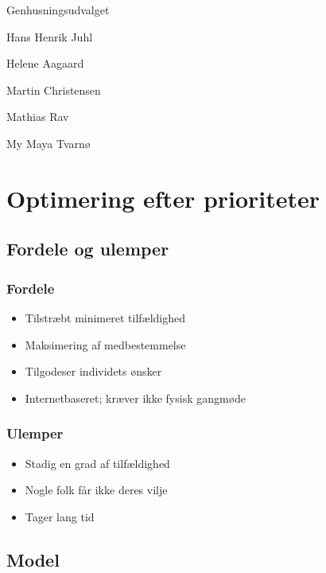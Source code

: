 \documentclass[article,oneside,11pt]{memoir}
\begin{document}
\begin{centering}
{\LARGE Genhusningsudvalget}

\vspace{1em} {\large
Hans Henrik Juhl

Helene Aagaard

Martin Christensen

Mathias Rav

My Maya Tvarnø

}
\end{centering}

\chapter{Optimering efter prioriteter}

\section{Fordele og ulemper}
\begin{minipage}[t]{0.45\linewidth}
\small
\subsection{Fordele}
\begin{itemize}[leftmargin=0ex]
\item[] Tilstræbt minimeret tilfældighed
\item[] Maksimering af medbestemmelse
\item[] Tilgodeser individets ønsker
\item[] Internetbaseret; kræver ikke fysisk gangmøde
\end{itemize}
\end{minipage}
\hspace{0.1\linewidth}
\begin{minipage}[t]{0.45\linewidth}
\small
\subsection{Ulemper}
\begin{itemize}[leftmargin=0ex]
\item[] Stadig en grad af tilfældighed
\item[] Nogle folk får ikke deres vilje
\item[] Tager lang tid
\end{itemize}
\end{minipage}

\section{Model}
\end{document}
